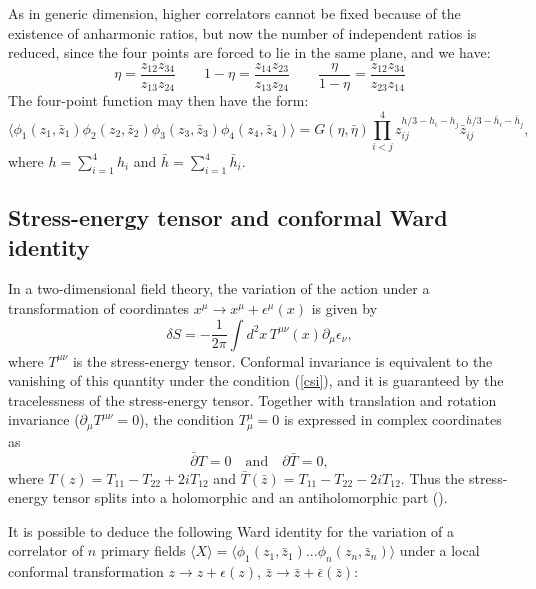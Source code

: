 \documentclass[a4paper,12pt]{report}
\begin{document}
As in generic dimension, higher correlators cannot be fixed because of the existence of anharmonic ratios, but
now the number of independent ratios is reduced, since the four points are forced to lie in the same plane, and
we have:
\begin{equation}\label{ratios}
\eta=\frac{z_{12}z_{34}}{z_{13}z_{24}} \qquad 1-\eta=\frac{z_{14}z_{23}}{z_{13}z_{24}} \qquad
\frac{\eta}{1-\eta}=\frac{z_{12}z_{34}}{z_{23}z_{14}}
\end{equation}
The four-point function may then have the form:
\begin{equation}\label{4pt}
\langle\phi_{1}(z_{1},\bar{z}_{1})\phi_{2}(z_{2},\bar{z}_{2})\phi_{3}(z_{3},\bar{z}_{3})\phi_{4}(z_{4},\bar{z}_{4})\rangle=G\left(\eta,\bar{\eta}\right)\prod_{i<j}^{4}z_{ij}^{h/3-h_{i}-h_{j}}\bar{z}_{ij}^{\bar{h}/3-\bar{h}_{i}-\bar{h}_{j}},
\end{equation}
where $h=\sum_{i=1}^{4}h_{i}$ and $\bar{h}=\sum_{i=1}^{4}\bar{h}_{i}$.


\subsection{Stress-energy tensor and conformal Ward identity}

In a two-dimensional field theory, the variation of the action under a transformation of coordinates
$x^{\mu}\rightarrow x^{\mu}+\epsilon^{\mu}(x)$ is given by
\begin{equation}\label{action}
\delta S=-\frac{1}{2\pi}\int d^{2}x \,T^{\mu\nu}(x)\partial_{\mu}\epsilon_{\nu},
\end{equation}
where $T^{\mu\nu}$ is the stress-energy tensor. Conformal invariance is equivalent to the vanishing of this
quantity under the condition (\ref{csi}), and it is guaranteed by the tracelessness of the stress-energy tensor.
Together with translation and rotation invariance ($\partial_{\mu}T^{\mu\nu}=0$), the condition $T^{\mu}_{\mu}=0$
is expressed in complex coordinates as
\begin{equation}\label{T}
\bar{\partial} T=0 \quad \textrm{and}\quad \partial\bar{T}=0,
\end{equation}
where $T(z)=T_{11}-T_{22}+2iT_{12}$ and $\bar{T}(\bar{z})=T_{11}-T_{22}-2iT_{12}$. Thus the stress-energy tensor
splits into a holomorphic and an antiholomorphic part (\cite{bpz}).

It is possible to deduce the following Ward identity for the variation of a correlator of $n$ primary fields
$\langle X\rangle=\langle\phi_{1}(z_{1},\bar{z}_{1})...\phi_{n}(z_{n},\bar{z}_{n})\rangle$ under a local conformal
transformation $z\rightarrow z+\epsilon(z)$, $\bar{z}\rightarrow \bar{z}+\bar{\epsilon}(\bar{z})$:
\end{document}
